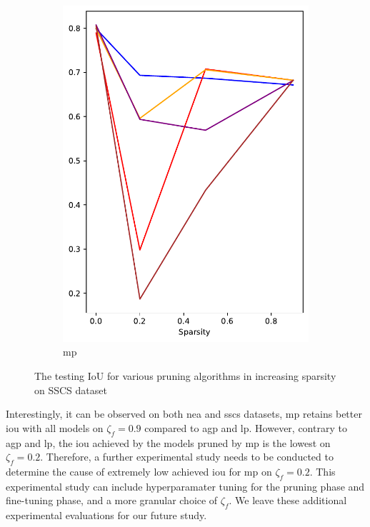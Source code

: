 \documentclass[mathematics,article,submit,pdftex,moreauthors]{Definitions/mdpi}
\begin{document}
\begin{figure}[!ht]
\begin{subfigure}[t]{.274\textwidth}
        \includegraphics[width=.95\linewidth]{figures/test/pruning-testing-score_CCSC_movement.pdf}
        \caption{\ac{mp}}
        \label{fig:results:test:sscs:mp}
      \end{subfigure}
      \caption{The testing IoU for various pruning algorithms in increasing sparsity on SSCS dataset}
      \label{fig:results:test:sscs}
\end{figure}

Interestingly, it can be observed on both \ac{nea}
and \ac{sscs} datasets, \ac{mp} retains
better \ac{iou} with all models on $\zeta_f=0.9$
compared to \ac{agp} and \ac{lp}.
However, contrary to \ac{agp} and \ac{lp},
the \ac{iou} achieved by the models pruned by \ac{mp}
is the lowest on $\zeta_f=0.2$. 
Therefore, a further experimental study
needs to be conducted to determine the cause
of extremely low achieved \ac{iou} for \ac{mp}
on $\zeta_f=0.2$. This experimental study
can include hyperparamater tuning for the pruning phase
and fine-tuning phase, and a more granular
choice of $\zeta_f$. We leave these additional experimental
evaluations for our future study.
\end{document}
